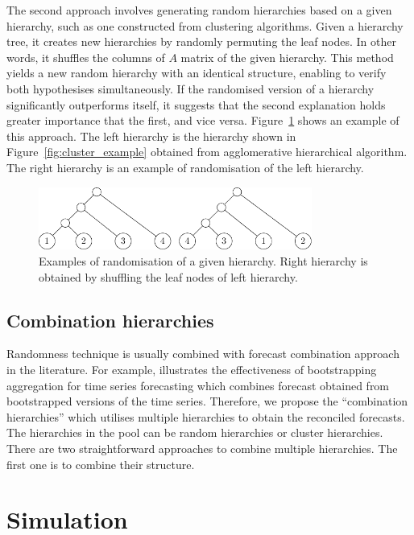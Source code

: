 \documentclass[a4paper,review,12pt,authoryear]{elsarticle}
\begin{document}
The second approach involves generating random hierarchies based on a given hierarchy, such as one constructed from clustering algorithms. Given a hierarchy tree, it creates new hierarchies by randomly permuting the leaf nodes. In other words, it shuffles the columns of $A$ matrix of the given hierarchy. This method yields a new random hierarchy with an identical structure, enabling to verify both hypothesises simultaneously. If the randomised version of a hierarchy significantly outperforms itself, it suggests that the second explanation holds greater importance that the first, and vice versa. Figure~\ref{fig:aggcluster_random} shows an example of this approach. The left hierarchy is the hierarchy shown in Figure~\ref{fig:cluster_example} obtained from agglomerative hierarchical algorithm. The right hierarchy is an example of randomisation of the left hierarchy.

\begin{figure}
    \centering
    \includegraphics[width=0.8\textwidth]{figures/aggcluster_random.pdf}
    \caption{\label{fig:aggcluster_random}Examples of randomisation of a given hierarchy. Right hierarchy is obtained by shuffling the leaf nodes of left hierarchy.}
\end{figure}

\subsection{Combination hierarchies}

Randomness technique is usually combined with forecast combination approach in the literature. For example, \cite{petropoulosExploringSourcesUncertainty2018a} illustrates the effectiveness of bootstrapping aggregation for time series forecasting which combines forecast obtained from bootstrapped versions of the time series. Therefore, we propose the ``combination hierarchies'' which utilises multiple hierarchies to obtain the reconciled forecasts. The hierarchies in the pool can be random hierarchies or cluster hierarchies. There are two straightforward approaches to combine multiple hierarchies. The first one is to combine their structure. 

\section{Simulation}
\label{sec:simulation}
\end{document}
